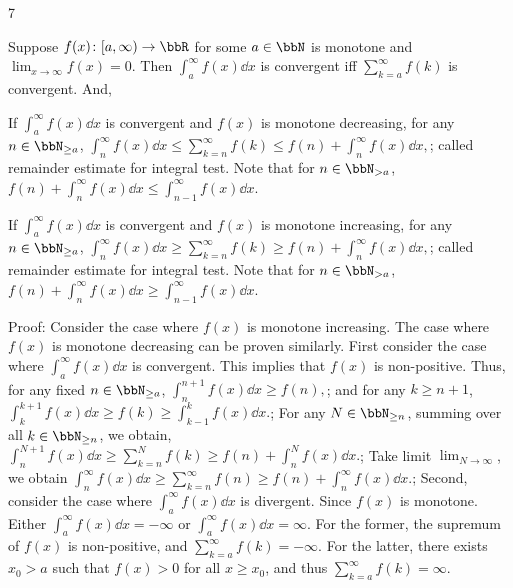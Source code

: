 \documentclass[a4paper,10pt]{extarticle}
\begin{document}
\begin{multicols}{7}

Suppose $f(x)\colon[a,\infty)\to\bbR$ for some $a\in\bbN$ is monotone and $\lim_{x\to\infty}f(x)=0$. Then $\int_a^{\infty}f(x)\dd{x}$ is convergent iff $\sum_{k=a}^{\infty}f(k)$ is convergent. And,

If $\int_a^{\infty}f(x)\dd{x}$ is convergent and $f(x)$ is monotone decreasing, for any $n\in\bbN_{\ge a}$,
\(\int_n^{\infty}f(x)\dd{x}\le\sum_{k=n}^{\infty}f(k)\le f(n)+\int_n^{\infty}f(x)\dd{x},\); 
called remainder estimate for integral test. Note that for $n\in\bbN_{>a}$, $f(n)+\int_n^{\infty}f(x)\dd{x}\le\int_{n-1}^{\infty}f(x)\dd{x}$.

If $\int_a^{\infty}f(x)\dd{x}$ is convergent and $f(x)$ is monotone increasing, for any $n\in\bbN_{\ge a}$,
\(\int_n^{\infty}f(x)\dd{x}\ge\sum_{k=n}^{\infty}f(k)\ge f(n)+\int_n^{\infty}f(x)\dd{x},\); 
called remainder estimate for integral test. Note that for $n\in\bbN_{>a}$, $f(n)+\int_n^{\infty}f(x)\dd{x}\ge\int_{n-1}^{\infty}f(x)\dd{x}$.

Proof:
Consider the case where $f(x)$ is monotone increasing. The case where $f(x)$ is monotone decreasing can be proven similarly. First consider the case where $\int_a^{\infty}f(x)\dd{x}$ is convergent. This implies that $f(x)$ is non-positive. Thus, for any fixed $n\in\bbN_{\ge a}$,
\(\int_n^{n+1}f(x)\dd{x}\ge f(n),\); 
and for any $k\geq n+1$,
\(\int_k^{k+1}f(x)\dd{x}\ge f(k)\ge\int_{k-1}^kf(x)\dd{x}.\); 
For any $N\in\bbN_{\ge n}$, summing over all $k\in\bbN_{\ge n}$, we obtain, 
\(\int_n^{N+1}f(x)\dd{x}\ge\sum_{k=n}^Nf(k)\ge f(n)+\int_n^Nf(x)\dd{x}.\); 
Take limit $\lim_{N\to\infty}$, we obtain
\(\int_n^{\infty}f(x)\dd{x}\ge\sum_{k=n}^{\infty}f(n)\ge f(n)+\int_n^{\infty}f(x)\dd{x}.\); 
Second, consider the case where $\int_a^{\infty}f(x)\dd{x}$ is divergent. Since $f(x)$ is monotone. Either $\int_a^{\infty}f(x)\dd{x}=-\infty$ or $\int_a^{\infty}f(x)\dd{x}=\infty$. For the former, the supremum of $f(x)$ is non-positive, and $\sum_{k=a}^{\infty}f(k)=-\infty$. For the latter, there exists $x_0>a$ such that $f(x)>0$ for all $x\ge x_0$, and thus $\sum_{k=a}^{\infty}f(k)=\infty$.




\end{multicols}
\end{document}
